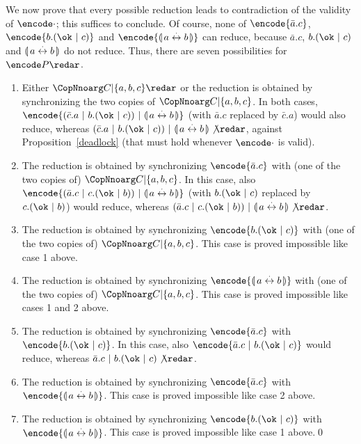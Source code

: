 \documentclass{LMCS}
\begin{document}
We now prove that every possible reduction leads to contradiction of the validity of $\encode\cdot$;
this suffices to conclude. Of course, none of $\encode{\bar a.c}$, $\encode{b.(\ok\ |\ c)}$
and $\encode{\assert{a \cheq b}}$ can reduce, because $\bar a.c$, $b.(\ok\ |\ c)$ and $\llparenthesis \, a \stackrel\cdot\leftrightarrow b \, \rrparenthesis$
do not reduce. Thus, there are seven possibilities for $\encode P \redar$.
\begin{enumerate}
	\item Either $\CopNnoarg C {|} {\{a,b,c\}} \redar$ or the reduction is obtained by synchronizing
	the two copies of $\CopNnoarg C {|} {\{a,b,c\}}$. In both cases, $\encode{(\bar c.a \ |\ b.(\ok\ |\ c))\ | \ \assert{a \cheq b}}$
    (with $\bar a.c$ replaced by $\bar c.a$)
	would also reduce, whereas $(\bar c.a \ |\ b.(\ok\ |\ c))\ | \ \assert{a \cheq b} \not\redar$, 
	against Proposition~\ref{deadlock} (that must hold whenever $\encode\cdot$ is valid).

	\item The reduction is obtained by synchronizing $\encode{\bar a.c}$
	with (one of the two copies of) $\CopNnoarg C {|} {\{a,b,c\}}$. In this case, 
	also $\encode{(\bar a.c \ |\ c.(\ok\ |\ b))\ | \ \assert{a \cheq b}}$
    (with $b.(\ok\ |\ c)$ replaced by $c.(\ok\ |\ b)$)
	would reduce, whereas $(\bar a.c \ |\ c.(\ok\ |\ b))\ | \ \assert{a \cheq b} \not\redar$.

	\item The reduction is obtained by synchronizing $\encode{b.(\ok\ |\ c)}$
	with (one of the two copies of) $\CopNnoarg C {|} {\{a,b,c\}}$. This case is
	proved impossible like case 1 above.

	\item The reduction is obtained by synchronizing $\encode{\assert{a \cheq b}}$
	with (one of the two copies of) $\CopNnoarg C {|} {\{a,b,c\}}$. This case is
	proved impossible like cases 1 and 2 above.

	\item The reduction is obtained by synchronizing $\encode{\bar a.c}$
	with $\encode{b.(\ok\ |\ c)}$. In this case, 
	also $\encode{\bar a.c \ |\ b.(\ok\ |\ c)}$
	would reduce, whereas $\bar a.c \ |\ b.(\ok\ |\ c) \not\redar$.

	\item The reduction is obtained by synchronizing $\encode{\bar a.c}$
	with $\encode{\assert{a \cheq b}}$. This case is
	proved impossible like case 2 above.

	\item The reduction is obtained by synchronizing $\encode{b.(\ok\ |\ c)}$
	with $\encode{\assert{a \cheq b}}$. This case is
	proved impossible like case 1 above.\qed
\end{enumerate}
\end{document}
